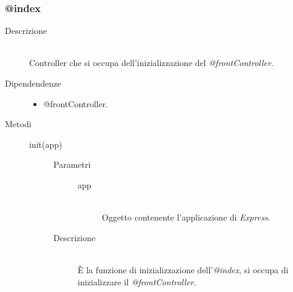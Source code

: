 \subsubsection{@index}
\begin{description}
 \item[Descrizione] \hfill \\
  Controller che si occupa dell'inizializzazione del \textit{@frontController}.
 \item[Dipendendenze] \hfill
 \begin{itemize}
 \item @frontController.
 \end{itemize}
 \item[Metodi] \hfill
  \begin{description}
    \item[init(app)]\hfill 
    \begin{description}
           		\item[Parametri] \hfill
           			\begin{description}
           				\item[app] \hfill \\
           				Oggetto contenente l'applicazione di \textit{Express}.
           			\end{description}
           		\item[Descrizione] \hfill \\
           		\`{E} la funzione di inizializzazione dell'\textit{@index}, si occupa di inizializzare il \textit{@frontController}.
       \end{description}
  	
  \end{description}
\end{description}

